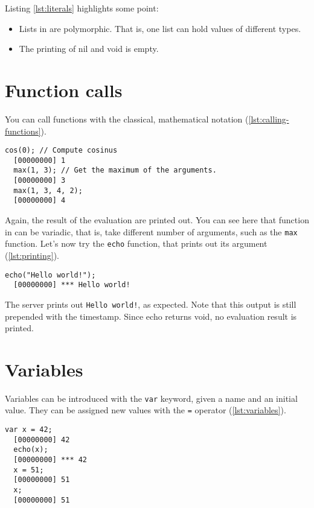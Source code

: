 \documentclass[openright,twoside,12pt]{report}
\begin{document}
Listing \ref{lst:literals} highlights some point:
\begin{itemize}
\item Lists in \urbi are polymorphic. That is, one list can hold
  values of different types.
\item The printing of nil and void is empty.
\end{itemize}

\section{Function calls}

You can call functions with the classical, mathematical notation
(\autoref{lst:calling-functions}).

\begin{lstlisting}[caption=Calling functions,label=lst:calling-functions]
  cos(0); // Compute cosinus
  [00000000] 1
  max(1, 3); // Get the maximum of the arguments.
  [00000000] 3
  max(1, 3, 4, 2);
  [00000000] 4
\end{lstlisting}

Again, the result of the evaluation are printed out. You can see here
that function in \urbi can be variadic, that is, take different number
of arguments, such as the \texttt{max} function. Let's now try the
\texttt{echo} function, that prints out its argument (\autoref{lst:printing}).

\begin{lstlisting}[caption=Printing out,label=lst:printing]
  echo("Hello world!");
  [00000000] *** Hello world!
\end{lstlisting}

The server prints out \texttt{Hello world!}, as expected. Note that
this output is still prepended with the timestamp. Since echo returns
void, no evaluation result is printed.

\section{Variables}

Variables can be introduced with the \texttt{var} keyword, given a
name and an initial value. They can be assigned new values with the
\texttt{=} operator (\autoref{lst:variables}).

\begin{lstlisting}[caption=Using variables,label=lst:variables]
  var x = 42;
  [00000000] 42
  echo(x);
  [00000000] *** 42
  x = 51;
  [00000000] 51
  x;
  [00000000] 51
\end{lstlisting}
\end{document}
